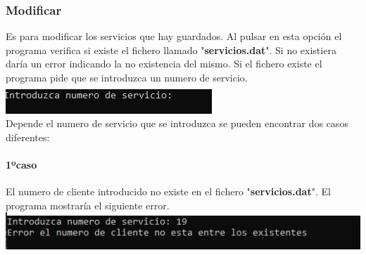 \documentclass[12pt]{article}
\begin{document}
\subsubsection{Modificar}
   Es para modificar los servicios que hay guardados. Al pulsar en esta opción el programa verifica si existe el fichero llamado "\textbf{servicios.dat}". Si no existiera daría un error indicando la no existencia del mismo. Si el fichero existe el programa pide que se introduzca un numero de servicio.\\
    \includegraphics[]{PedirNumeroDeServicio.PNG}\\
    Depende el numero de servicio que se introduzca se pueden encontrar dos casos diferentes:
    \paragraph{1ºcaso}
    El numero de cliente introducido no existe en el fichero "\textbf{servicios.dat}". El programa mostraría el siguiente error.\\
    \includegraphics[]{ErrorNumeroDeServicioNoExiste.PNG}
\end{document}
